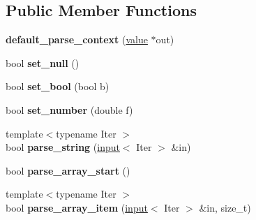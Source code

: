 \subsection*{Public Member Functions}
\begin{DoxyCompactItemize}
\item 
\hypertarget{classpicojson_1_1default__parse__context_ad326572abe85f9d05dc23be4cf76ff3c}{{\bfseries default\+\_\+parse\+\_\+context} (\hyperlink{classpicojson_1_1value}{value} $\ast$out)}\label{classpicojson_1_1default__parse__context_ad326572abe85f9d05dc23be4cf76ff3c}

\item 
\hypertarget{classpicojson_1_1default__parse__context_a2d852ba1f0b115c89378fcb5f10580b5}{bool {\bfseries set\+\_\+null} ()}\label{classpicojson_1_1default__parse__context_a2d852ba1f0b115c89378fcb5f10580b5}

\item 
\hypertarget{classpicojson_1_1default__parse__context_ae1935ef455fc2bed9195426cfee5713a}{bool {\bfseries set\+\_\+bool} (bool b)}\label{classpicojson_1_1default__parse__context_ae1935ef455fc2bed9195426cfee5713a}

\item 
\hypertarget{classpicojson_1_1default__parse__context_a9b2046a9cb6d66aad835b84ffda20b86}{bool {\bfseries set\+\_\+number} (double f)}\label{classpicojson_1_1default__parse__context_a9b2046a9cb6d66aad835b84ffda20b86}

\item 
\hypertarget{classpicojson_1_1default__parse__context_a476c7d30a5cf382b48201ec64585c2f3}{{\footnotesize template$<$typename Iter $>$ }\\bool {\bfseries parse\+\_\+string} (\hyperlink{classpicojson_1_1input}{input}$<$ Iter $>$ \&in)}\label{classpicojson_1_1default__parse__context_a476c7d30a5cf382b48201ec64585c2f3}

\item 
\hypertarget{classpicojson_1_1default__parse__context_a5c355f843ceacde134997f5bbbda1d23}{bool {\bfseries parse\+\_\+array\+\_\+start} ()}\label{classpicojson_1_1default__parse__context_a5c355f843ceacde134997f5bbbda1d23}

\item 
\hypertarget{classpicojson_1_1default__parse__context_a5f65224e655633b20c1f8c5967c153bb}{{\footnotesize template$<$typename Iter $>$ }\\bool {\bfseries parse\+\_\+array\+\_\+item} (\hyperlink{classpicojson_1_1input}{input}$<$ Iter $>$ \&in, size\+\_\+t)}\label{classpicojson_1_1default__parse__context_a5f65224e655633b20c1f8c5967c153bb}


\end{DoxyCompactItemize}

